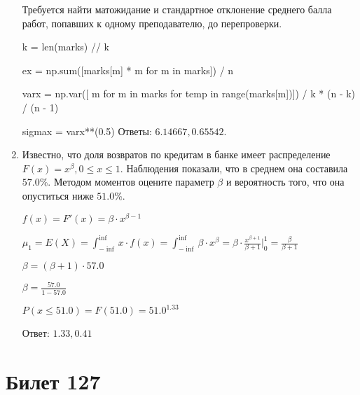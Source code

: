 \documentclass[a4paper,12pt]{article}
\begin{document}
\begin{enumerate}
	Требуется найти матожидание и стандартное отклонение среднего балла работ, попавших к одному преподавателю, до перепроверки.
    


    


    k = len(marks) // k

    ex = np.sum([marks[m] * m for m in marks]) / n

    varx = np.var([ m for m in marks for temp in range(marks[m])]) / k * (n - k) / (n - 1)

    sigmax = varx**(0.5)
    Ответы: $6.14667, 0.65542$.

    

\item

    
	Известно, что доля возвратов по кредитам в банке имеет распределение $F(x) = x^{\beta}, 0 \le x \le 1$. Наблюдения показали, что в среднем она составила $57.0$\%. Методом моментов оцените параметр $\beta$ и вероятность того, что она опуститься ниже $51.0$\%.
	


	

	$f(x) = F'(x) = \beta \cdot x^{\beta - 1}$

	$\mu_{1} = E(X) = \int_{-\inf}^{\inf}x \cdot f(x) = \int_{-\inf}^{\inf} \beta \cdot x^{\beta} = \beta \cdot \frac{x^{\beta + 1}}{\beta + 1}\bigg|_0^1 = \frac{\beta}{\beta + 1}$

	$\beta = (\beta + 1) \cdot 57.0$

	$\beta = \frac{57.0}{1 - 57.0}$

	$ P(x \le 51.0) = F(51.0) = 51.0^{1.33} $

    Ответ: $1.33, 0.41$
	


\end{enumerate}

\section{Билет 127}
\end{document}
